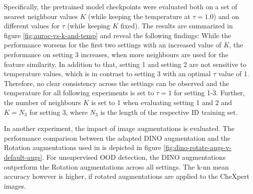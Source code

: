 Specifically, the pretrained model checkpoints were evaluated both on a set of nearest neighbour values $K$ (while keeping the temperature at $\tau=1.0$) and on different values for $\tau$ (while keeping $K$ fixed).
The results are summarized in figure \ref{fig:auroc-vs-k-and-temp} and reveal the following findings:
While the performance worsens for the first two settings with an increased value of $K$, the performance on setting 3 increases, when more neighbours are used for the feature similarity.
In addition to that, setting 1 and setting 2 are not sensitive to temperature values, which is in contrast to setting 3 with an optimal $\tau$ value of 1.
Therefore, no clear consistency across the settings can be observed and the temperature for all following experiments is set to $\tau=1$ for setting 1-3.
Further, the number of neighbours $K$ is set to 1 when evaluating setting 1 and 2 and $K=N_3$ for setting 3, where $N_3$ is the length of the respective ID training set.
\par
In another experiment, the impact of image augmentations is evaluated.
The performance comparison between the adapted DINO augmentation and the Rotation augmentations used in \citep{Azizi2021} is depicted in figure \ref{fig:dino-rotate-augs-v-default-augs}.
For unsupervised OOD detection, the DINO augmentations outperform the Rotation augmentations across all settings.
The k-nn mean accuracy however is higher, if rotated augmentations are applied to the CheXpert images.

